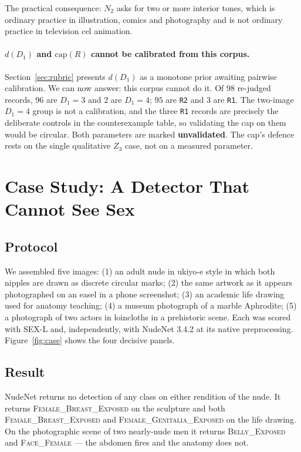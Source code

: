 \documentclass[11pt]{article}
\newcommand{\sexl}{\textsc{SEX-L}}
\begin{document}
The practical consequence: $N_2$ asks for two or more interior tones, which is ordinary practice in illustration, comics and photography and is not ordinary practice in television cel animation.

\paragraph{$d(D_1)$ and $\mathrm{cap}(R)$ cannot be calibrated from this corpus.}
Section~\ref{sec:rubric} presents $d(D_1)$ as a monotone prior awaiting pairwise calibration. We can now answer: this corpus cannot do it. Of 98 re-judged records, $96$ are $D_1=3$ and $2$ are $D_1=4$; $95$ are \texttt{R2} and $3$ are \texttt{R1}. The two-image $D_1=4$ group is not a calibration, and the three \texttt{R1} records are precisely the deliberate controls in the counterexample table, so validating the cap on them would be circular. Both parameters are marked \textbf{unvalidated}. The cap's defence rests on the single qualitative $Z_3$ case, not on a measured parameter.

\section{Case Study: A Detector That Cannot See Sex}
\label{sec:cases}
\subsection{Protocol}
We assembled five images: (1) an adult nude in ukiyo-e style in which both nipples are drawn as discrete circular marks; (2) the same artwork as it appears photographed on an easel in a phone screenshot; (3) an academic life drawing used for anatomy teaching; (4) a museum photograph of a marble Aphrodite; (5) a photograph of two actors in loincloths in a prehistoric scene. Each was scored with \sexl{} and, independently, with NudeNet 3.4.2 at its native preprocessing. Figure~\ref{fig:case} shows the four decisive panels.

\subsection{Result}
NudeNet returns no detection of any class on either rendition of the nude. It returns \textsc{Female\_Breast\_Exposed} on the sculpture and both \textsc{Female\_Breast\_Exposed} and \textsc{Female\_Genitalia\_Exposed} on the life drawing. On the photographic scene of two nearly-nude men it returns \textsc{Belly\_Exposed} and \textsc{Face\_Female} --- the abdomen fires and the anatomy does not.
\end{document}
